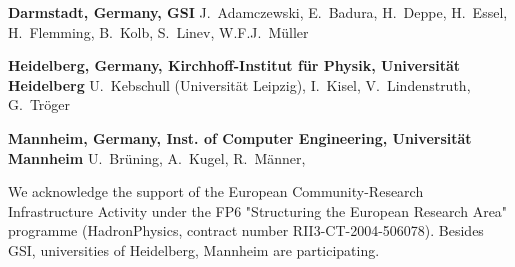 
\begin{compactitem}[$\bullet$]
\item {\bf Darmstadt, Germany, GSI }
J.~Adamczewski,
E.~Badura,
H.~Deppe,
H.~Essel,
H.~Flemming,
B.~Kolb,
S.~Linev,
W.F.J.~M{\"u}ller

\item {\bf Heidelberg, Germany, Kirchhoff-Institut f{\"u}r Physik,
Universit{\"a}t Heidelberg\footnotemark[1] }
U.~Kebschull (Universit{\"a}t Leipzig),
I.~Kisel,
V.~Lindenstruth,
G.~Tr{\"o}ger

\item {\bf Mannheim, Germany, Inst. of Computer Engineering,
Universit{\"a}t Mannheim \footnotemark[1]}
U.~Br{\"u}ning,
A.~Kugel,
R.~M{\"a}nner,

\end{compactitem}

\vspace{10cm}



\noindent We acknowledge the support of the European Community-Research Infrastructure Activity
under the FP6 "Structuring the European Research Area" programme
(HadronPhysics, contract number RII3-CT-2004-506078).
Besides GSI, universities of Heidelberg, Mannheim are participating.

